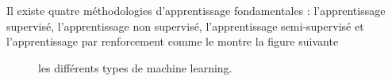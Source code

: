 \documentclass{report}
\begin{document}
Il existe quatre méthodologies d'apprentissage fondamentales : l'apprentissage supervisé, l'apprentissage non supervisé, l'apprentissage semi-supervisé et l'apprentissage par renforcement comme le montre la figure suivante
  \begin{figure}[h]
        \centering
        \caption{les différents types de machine learning.\cite{Mohammad Mustafa Taye,2023}}
        \label{g}
    \end{figure}
\end{document}
